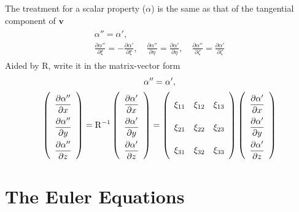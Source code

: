 \documentclass[a4paper,12pt,dvips]{article}
\begin{document}
The treatment for a scalar property ($\alpha$) is the same as that of the
tangential component of $\mathbf{v}$
\begin{align*}
\begin{gathered}
  \alpha'' = \alpha', \\
  \frac{\partial \alpha''}{\partial\xi} =
  -\frac{\partial \alpha'}{\partial\xi}, \quad
  \frac{\partial \alpha''}{\partial\eta} =
  \frac{\partial \alpha'}{\partial\eta}, \quad
  \frac{\partial \alpha''}{\partial\zeta} =
  \frac{\partial \alpha'}{\partial\zeta}
\end{gathered}
\end{align*}
Aided by $\mathrm{R}$, write it in the matrix-vector form
\begin{align}
\begin{gathered}
  \alpha'' = \alpha', \\
  \renewcommand{\arraystretch}{2.2}
  \left(\begin{array}{c}
    \dfrac{\partial\alpha''}{\partial x} \\
    \dfrac{\partial\alpha''}{\partial y} \\
    \dfrac{\partial\alpha''}{\partial z} \\
  \end{array}\right)
  = \mathrm{R}^{-1}
  \left(\begin{array}{c}
    \dfrac{\partial\alpha'}{\partial x} \\
    \dfrac{\partial\alpha'}{\partial y} \\
    \dfrac{\partial\alpha'}{\partial z} \\
  \end{array}\right)
  = \left(\begin{array}{ccc}
    \xi_{11} & \xi_{12} & \xi_{13} \\
    \xi_{21} & \xi_{22} & \xi_{23} \\
    \xi_{31} & \xi_{32} & \xi_{33}
  \end{array}\right)
  \left(\begin{array}{c}
    \dfrac{\partial\alpha'}{\partial x} \\
    \dfrac{\partial\alpha'}{\partial y} \\
    \dfrac{\partial\alpha'}{\partial z} \\
  \end{array}\right)
\end{gathered}
\label{e:treat:sca}
\end{align}

\section{The Euler Equations}
\end{document}
